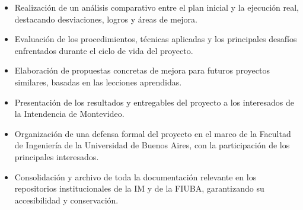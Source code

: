 \documentclass[
11pt, %
]{charter}
\begin{document}
\begin{itemize}
  \item Realización de un análisis comparativo entre el plan inicial y la ejecución real, destacando desviaciones, logros y áreas de mejora.
  \item Evaluación de los procedimientos, técnicas aplicadas y los principales desafíos enfrentados durante el ciclo de vida del proyecto.
  \item Elaboración de propuestas concretas de mejora para futuros proyectos similares, basadas en las lecciones aprendidas.
  \item Presentación de los resultados y entregables del proyecto a los interesados de la Intendencia de Montevideo.
  \item Organización de una defensa formal del proyecto en el marco de la Facultad de Ingeniería de la Universidad de Buenos Aires, con la participación de los principales interesados.
  \item Consolidación y archivo de toda la documentación relevante en los repositorios institucionales de la IM y de la FIUBA, garantizando su accesibilidad y conservación.
\end{itemize}

\end{document}
